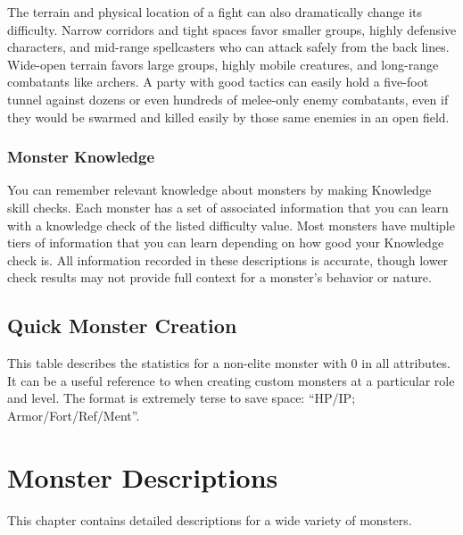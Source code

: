     The terrain and physical location of a fight can also dramatically change its difficulty.
    Narrow corridors and tight spaces favor smaller groups, highly defensive characters, and mid-range spellcasters who can attack safely from the back lines.
    Wide-open terrain favors large groups, highly mobile creatures, and long-range combatants like archers.
    A party with good tactics can easily hold a five-foot tunnel against dozens or even hundreds of melee-only enemy combatants, even if they would be swarmed and killed easily by those same enemies in an open field.

  \subsection{Monster Knowledge}
    You can remember relevant knowledge about monsters by making Knowledge skill checks.
    Each monster has a set of associated information that you can learn with a knowledge check of the listed difficulty value.
    Most monsters have multiple tiers of information that you can learn depending on how good your Knowledge check is.
    All information recorded in these descriptions is accurate, though lower check results may not provide full context for a monster's behavior or nature.

\section{Quick Monster Creation}

  This table describes the statistics for a non-elite monster with 0 in all attributes.
  It can be a useful reference to when creating custom monsters at a particular role and level.
  The format is extremely terse to save space: ``HP/IP; Armor/Fort/Ref/Ment''.

  

  \chapter{Monster Descriptions}

  This chapter contains detailed descriptions for a wide variety of monsters.

  
